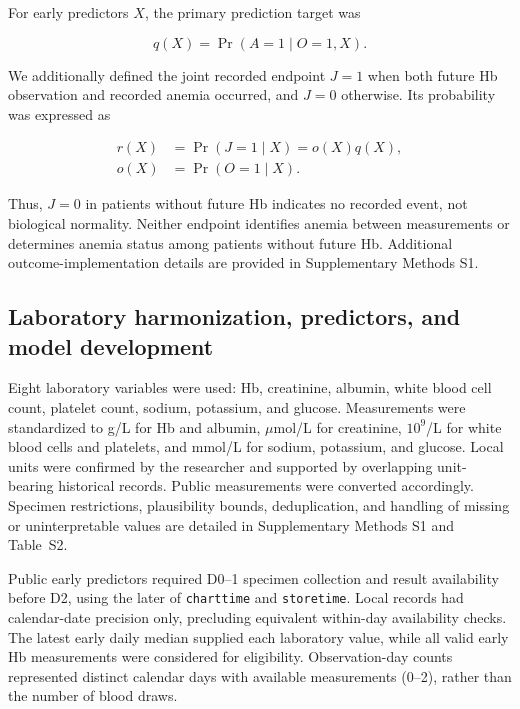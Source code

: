 \documentclass[pdflatex,sn-mathphys-num]{sn-jnl}%
\theoremstyle{thmstyleone}%
\theoremstyle{thmstyletwo}%
\theoremstyle{thmstylethree}%
\begin{document}
For early predictors $X$, the primary prediction target was

\begin{equation}
q(X)=\Pr(A=1\mid O=1,X).
\end{equation}

We additionally defined the joint recorded endpoint $J=1$ when both future Hb observation and recorded anemia occurred, and $J=0$ otherwise. Its probability was expressed as

\begin{equation}
\begin{aligned}
r(X)&=\Pr(J=1\mid X)=o(X)q(X),\\
o(X)&=\Pr(O=1\mid X).
\end{aligned}
\end{equation}

Thus, $J=0$ in patients without future Hb indicates no recorded event, not biological normality. Neither endpoint identifies anemia between measurements or determines anemia status among patients without future Hb. Additional outcome-implementation details are provided in Supplementary Methods S1.

\subsection{Laboratory harmonization, predictors, and model development}

Eight laboratory variables were used: Hb, creatinine, albumin, white blood cell count, platelet count, sodium, potassium, and glucose. Measurements were standardized to g/L for Hb and albumin, $\mu$mol/L for creatinine, $10^9$/L for white blood cells and platelets, and mmol/L for sodium, potassium, and glucose. Local units were confirmed by the researcher and supported by overlapping unit-bearing historical records. Public measurements were converted accordingly. Specimen restrictions, plausibility bounds, deduplication, and handling of missing or uninterpretable values are detailed in Supplementary Methods S1 and Table~S2.

Public early predictors required D0--1 specimen collection and result availability before D2, using the later of \texttt{charttime} and \texttt{storetime}. Local records had calendar-date precision only, precluding equivalent within-day availability checks. The latest early daily median supplied each laboratory value, while all valid early Hb measurements were considered for eligibility. Observation-day counts represented distinct calendar days with available measurements (0--2), rather than the number of blood draws.
\end{document}

